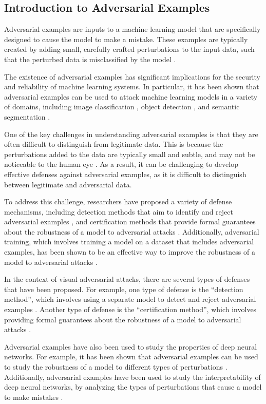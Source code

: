 \documentclass[11pt]{article}
\begin{document}
\subsection{Introduction to Adversarial Examples}

Adversarial examples are inputs to a machine learning model that are specifically designed to cause the model to make a mistake. These examples are typically created by adding small, carefully crafted perturbations to the input data, such that the perturbed data is misclassified by the model \cite{ref20}.

The existence of adversarial examples has significant implications for the security and reliability of machine learning systems. In particular, it has been shown that adversarial examples can be used to attack machine learning models in a variety of domains, including image classification \cite{ref21}, object detection \cite{ref22}, and semantic segmentation \cite{ref23}.

One of the key challenges in understanding adversarial examples is that they are often difficult to distinguish from legitimate data. This is because the perturbations added to the data are typically small and subtle, and may not be noticeable to the human eye \cite{ref24}. As a result, it can be challenging to develop effective defenses against adversarial examples, as it is difficult to distinguish between legitimate and adversarial data.

To address this challenge, researchers have proposed a variety of defense mechanisms, including detection methods that aim to identify and reject adversarial examples \cite{ref25}, and certification methods that provide formal guarantees about the robustness of a model to adversarial attacks \cite{ref26}. Additionally, adversarial training, which involves training a model on a dataset that includes adversarial examples, has been shown to be an effective way to improve the robustness of a model to adversarial attacks \cite{ref27}.

In the context of visual adversarial attacks, there are several types of defenses that have been proposed. For example, one type of defense is the ``detection method'', which involves using a separate model to detect and reject adversarial examples \cite{ref25}. Another type of defense is the ``certification method'', which involves providing formal guarantees about the robustness of a model to adversarial attacks \cite{ref26}.

Adversarial examples have also been used to study the properties of deep neural networks. For example, it has been shown that adversarial examples can be used to study the robustness of a model to different types of perturbations \cite{ref23}. Additionally, adversarial examples have been used to study the interpretability of deep neural networks, by analyzing the types of perturbations that cause a model to make mistakes \cite{ref28}.
\end{document}
